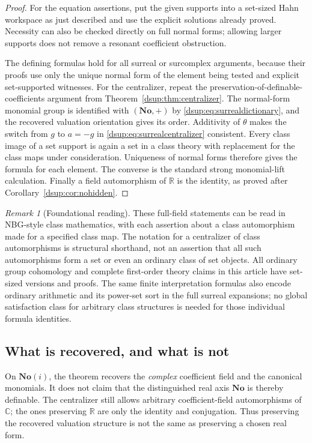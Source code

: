 \documentclass[11pt,oneside]{article}
\numberwithin{equation}{section}
\theoremstyle{definition}
\theoremstyle{remark}
\newtheorem{remark}[theorem]{Remark}
\newcommand{\No}{\mathbf{No}}
\newcommand{\SC}{\No(i)}
\newcommand{\R}{\mathbb R}
\newcommand{\C}{\mathbb C}
\begin{document}
\begin{proof}
For the equation assertions, put the given supports into a set-sized
Hahn workspace as just described and use the explicit solutions already
proved. Necessity can also be checked directly on full normal forms;
allowing larger supports does not remove a resonant coefficient
obstruction.

The defining formulas hold for all surreal or surcomplex arguments,
because their proofs use only the unique normal form of the element
being tested and explicit set-supported witnesses. For the centralizer,
repeat the preservation-of-definable-coefficients argument from
Theorem~\ref{dsup:thm:centralizer}. The normal-form monomial group is identified
with $(\No,+)$ by \eqref{dsup:eq:surrealdictionary}, and the recovered valuation
orientation gives its order. Additivity of $\theta$ makes the switch from
$g$ to $a=-g$ in \eqref{dsup:eq:surrealcentralizer} consistent. Every class
image of a set support is again a set in a class theory with replacement
for the class maps under consideration. Uniqueness of normal forms
therefore gives the formula for each element. The converse is the
standard strong monomial-lift calculation. Finally a field automorphism
of $\R$ is the identity, as proved after
Corollary~\ref{dsup:cor:nohidden}.
\end{proof}

\begin{remark}[Foundational reading]
These full-field statements can be read in NBG-style class mathematics,
with each assertion about a class automorphism made for a specified
class map. The notation for a centralizer of class automorphisms is
structural shorthand, not an assertion that all such automorphisms form
a set or even an ordinary class of set objects. All ordinary group
cohomology and complete first-order theory claims in this article have
set-sized versions and proofs. The same finite interpretation formulas
also encode ordinary arithmetic and its power-set sort in the full
surreal expansions; no global satisfaction class for arbitrary class
structures is needed for those individual formula identities.
\end{remark}

\subsection{What is recovered, and what is not}\label{dsup:sub:recovered}

On $\SC$, the theorem recovers the \emph{complex} coefficient field and
the canonical monomials. It does not claim that the distinguished real
axis $\No$ is thereby definable. The centralizer still allows arbitrary
coefficient-field automorphisms of $\C$; the ones preserving $\R$ are
only the identity and conjugation. Thus preserving the recovered
valuation structure is not the same as preserving a chosen real form.
\end{document}
